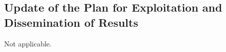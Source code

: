 
\clearpage
\subsection{Update of the Plan for Exploitation and Dissemination of Results}
\label{sec:exploitation-dissemination}

Not applicable. 

